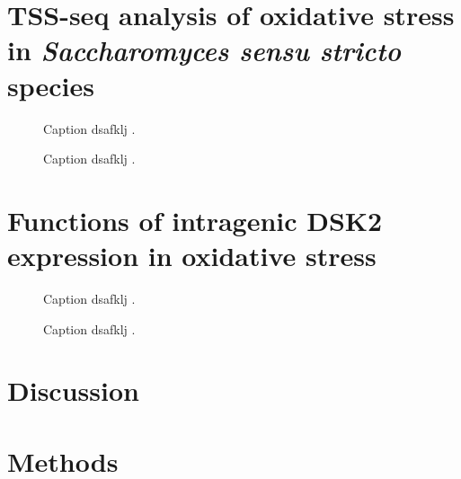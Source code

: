 \section{TSS-seq analysis of oxidative stress in \textit{Saccharomyces sensu stricto} species}

\begin{figure}
\caption[A figure showing TSS-seq coverage over oxidative-stress-induced TSSs in the three species.]{Caption dsafklj .}
\end{figure}

\begin{figure}
\caption[A figure showing TSS-seq coverage over DSK2 in the three species, possibly with the corresponding northern blot.]{Caption dsafklj .}
\end{figure}

\section{Functions of intragenic DSK2 expression in oxidative stress}

\begin{figure}
\caption[A figure showing TSS-seq, TFIIB ChIP-nexus, and MNase-ChIP-seq at DSK2.]{Caption dsafklj .}
\end{figure}

\begin{figure}
\caption[A figure showing DSK2 fitness competition results.]{Caption dsafklj .}
\end{figure}

\section{Discussion}

\section{Methods}

\newpage

\begingroup
\singlespacing

\endgroup

